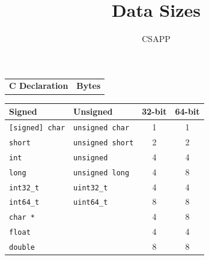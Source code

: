 \documentclass{article}
\title{Data Sizes}
\author{CSAPP}
\begin{document}
\maketitle
\begin{center}
   \begin{tabular}{p{6cm} r}
    \textbf{C Declaration} & \textbf{Bytes} 
\end{tabular} 
\end{center}
\begin{center}
\begin{tabular}{llcc}
  \toprule
  \textbf{Signed} & \textbf{Unsigned} & \textbf{32-bit} & \textbf{64-bit} \\
  \midrule
  \texttt{[signed] char} & \texttt{unsigned char}    & 1 & 1\\
  \texttt{short}         & \texttt{unsigned short}   & 2 & 2\\
  \texttt{int}           & \texttt{unsigned}         & 4 & 4\\
  \texttt{long}          & \texttt{unsigned long}    & 4 & 8\\
  \texttt{int32\_t}      & \texttt{uint32\_t}        & 4 & 4\\
  \texttt{int64\_t}       & \texttt{uint64\_t}       & 8 & 8\\
  \texttt{char *}        &                           & 4 & 8\\
  \texttt{float}         &                           & 4 & 4\\
  \texttt{double}        &                           & 8 & 8\\
  \bottomrule
\end{tabular}
\end{center}
\end{document}

